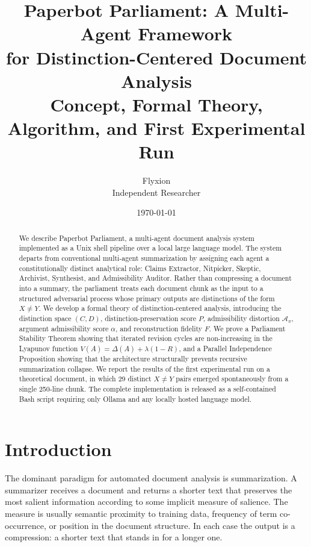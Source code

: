\documentclass[12pt, a4paper]{article}
\title{\textbf{Paperbot Parliament: A Multi-Agent Framework\\
for Distinction-Centered Document Analysis}\\[0.6em]
\large Concept, Formal Theory, Algorithm, and First Experimental Run}
\author{Flyxion\\
\small Independent Researcher}
\date{\today}
\theoremstyle{principle}
\theoremstyle{definition}
\begin{document}
\maketitle
\newpage

\begin{abstract}
We describe Paperbot Parliament, a multi-agent document analysis system implemented
as a Unix shell pipeline over a local large language model. The system departs from
conventional multi-agent summarization by assigning each agent a constitutionally
distinct analytical role: Claims Extractor, Nitpicker, Skeptic, Archivist,
Synthesist, and Admissibility Auditor. Rather than compressing a document into a
summary, the parliament treats each document chunk as the input to a structured
adversarial process whose primary outputs are distinctions of the form $X \neq Y$.
We develop a formal theory of distinction-centered analysis, introducing the
distinction space $(C, D)$, distinction-preservation score $P$, admissibility
distortion $\mathcal{A}_\pi$, argument admissibility score $\alpha$, and
reconstruction fidelity $F$. We prove a Parliament Stability Theorem showing that
iterated revision cycles are non-increasing in the Lyapunov function
$V(A) = \Delta(A) + \lambda(1 - R)$, and a Parallel Independence Proposition showing
that the architecture structurally prevents recursive summarization collapse. We
report the results of the first experimental run on a theoretical document, in which
29 distinct $X \neq Y$ pairs emerged spontaneously from a single 250-line chunk.
The complete implementation is released as a self-contained Bash script requiring
only Ollama and any locally hosted language model.
\end{abstract}

\newpage
\tableofcontents
\newpage

\section{Introduction}

The dominant paradigm for automated document analysis is summarization. A summarizer
receives a document and returns a shorter text that preserves the most salient
information according to some implicit measure of salience. The measure is usually
semantic proximity to training data, frequency of term co-occurrence, or position in
the document structure. In each case the output is a compression: a shorter text that
stands in for a longer one.
\end{document}
